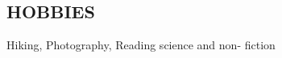 \documentclass[11pt]{res} %
\begin{document}
\begin{resume}
\section{HOBBIES} 
 
Hiking, Photography, Reading science and non- fiction
 
 

\end{resume}
\end{document}

